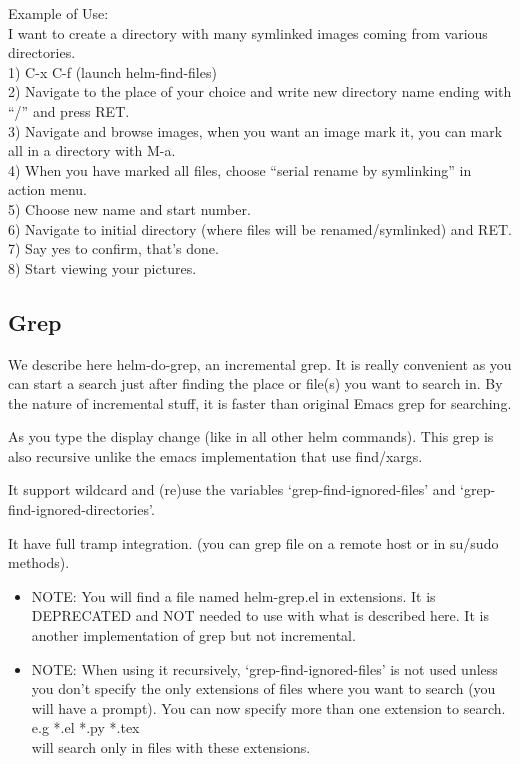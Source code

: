 \documentclass[a4paper,11pt]{article}
\begin{document}
Example of Use:\\
I want to create a directory with many symlinked images coming from various directories.\\
1) C-x C-f (launch helm-find-files)\\
2) Navigate to the place of your choice and write new directory name ending with ``/'' and press RET.\\
3) Navigate and browse images, when you want an image mark it, you can mark all in a directory with M-a.\\
4) When you have marked all files, choose ``serial rename by symlinking'' in action menu.\\
5) Choose new name and start number.\\
6) Navigate to initial directory (where files will be renamed/symlinked) and RET.\\
7) Say yes to confirm, that's done.\\
8) Start viewing your pictures.\\

\subsection{Grep}
\label{sec:grep}
We describe here helm-do-grep, an incremental grep.
It is really convenient as you can start a search just after finding the place or file(s) you want to search in.
By the nature of incremental stuff, it is faster than original Emacs grep for searching.

As you type the display change (like in all other helm commands).
This grep is also recursive unlike the emacs implementation that use find/xargs.

It support wildcard and (re)use the variables `grep-find-ignored-files'
and `grep-find-ignored-directories'.

It have full tramp integration.
(you can grep file on a remote host or in su/sudo methods).

\begin{itemize}
\item NOTE: 
You will find a file named helm-grep.el in extensions.
It is DEPRECATED and NOT needed to use with what is described here.
It is another implementation of grep but not incremental.
\end{itemize}


\begin{itemize}
\item NOTE:
When using it recursively, `grep-find-ignored-files' is not used unless you don't specify
the only extensions of files where you want to search (you will have a prompt).
You can now specify more than one extension to search.\\
e.g *.el *.py *.tex \\
will search only in files with these extensions.
\end{itemize}
\end{document}

